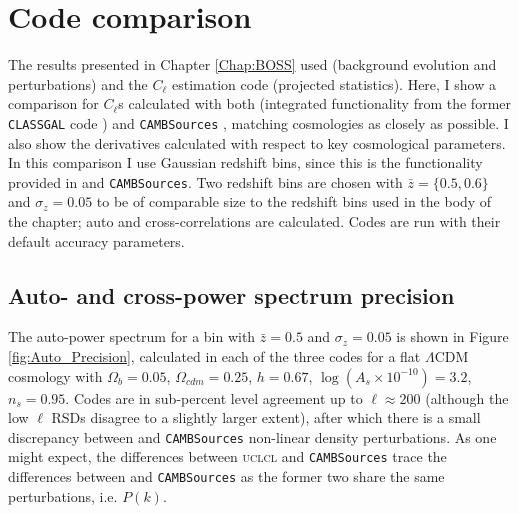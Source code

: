 \section{Code comparison}\label{Apx:Code_Comparison}
The results presented in Chapter \ref{Chap:BOSS} used \class \citep{Class} (background evolution and perturbations) and the $C_{\ell}$ estimation code \uclcl (projected statistics). Here, I show a comparison for $C_{\ell}$s calculated with both \class (integrated functionality from the former \texttt{CLASSGAL} code \citep{CLASSgal}) and \texttt{CAMBSources} \citep{CambSources}, matching cosmologies as closely as possible. I also show the derivatives calculated with respect to key cosmological parameters. In this comparison I use Gaussian redshift bins, since this is the functionality provided in \class and \texttt{CAMBSources}. Two redshift bins are chosen with $\bar{z} = \{0.5,0.6\}$ and $\sigma_z = 0.05$ to be of comparable size to the redshift bins used in the body of the chapter; auto and cross-correlations are calculated. Codes are run with their default accuracy parameters. 

\subsection{Auto- and cross-power spectrum precision}
The auto-power spectrum for a bin with $\bar{z} = 0.5$ and $\sigma_z = 0.05$ is shown in Figure \ref{fig:Auto_Precision}, calculated in each of the three codes for a flat $\Lambda$CDM cosmology with $\Omega_b = 0.05$, $\Omega_{cdm} = 0.25$, $h = 0.67$, $\log(A_s \times 10^{-10}) = 3.2$, $n_s = 0.95$. Codes are in sub-percent level agreement up to $\ell \approx 200$ (although the \class low $\ell$ RSDs disagree to a slightly larger extent), after which there is a small discrepancy between \class and \texttt{CAMBSources} non-linear density perturbations. As one might expect, the differences between \textsc{uclcl} and \texttt{CAMBSources} trace the differences between \class and \texttt{CAMBSources} as the former two share the same perturbations, i.e. $P(k)$.

